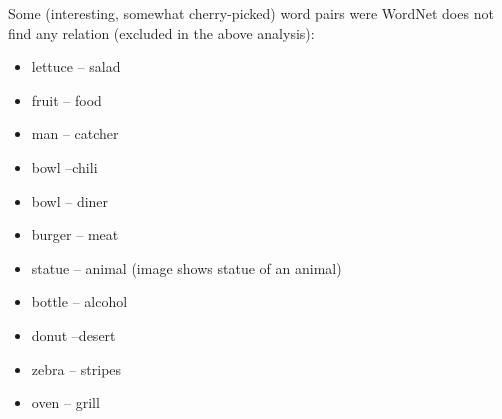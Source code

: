 Some (interesting, somewhat cherry-picked) word pairs were WordNet does not find any relation (excluded in the above analysis):

\begin{itemize}
\item lettuce -- salad
\item fruit -- food
\item man -- catcher
\item bowl --chili
\item bowl -- diner  
\item burger -- meat
\item statue -- animal (image shows statue of an animal)
\item bottle -- alcohol
\item donut --desert  
\item zebra -- stripes
\item oven -- grill
\end{itemize}







